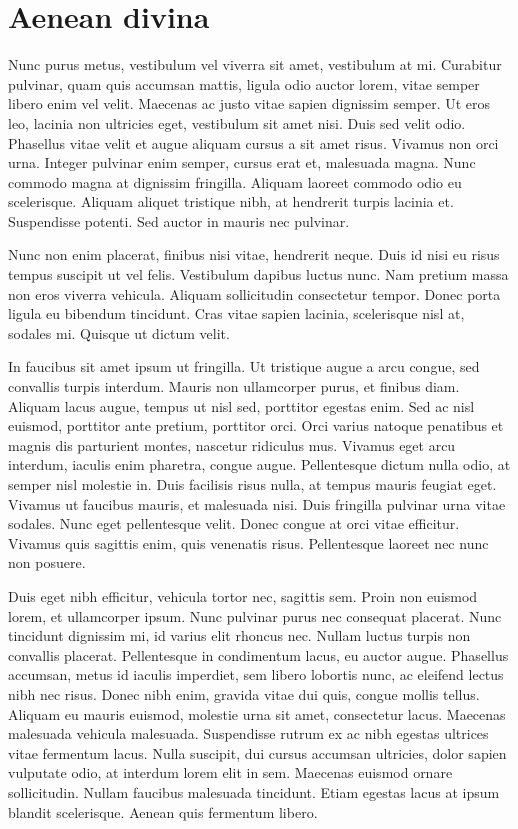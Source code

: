 \section{Aenean divina}

Nunc purus metus, vestibulum vel viverra sit amet, vestibulum at mi. Curabitur pulvinar, quam quis accumsan mattis, ligula odio auctor lorem, vitae semper libero enim vel velit. Maecenas ac justo vitae sapien dignissim semper. Ut eros leo, lacinia non ultricies eget, vestibulum sit amet nisi. Duis sed velit odio. Phasellus vitae velit et augue aliquam cursus a sit amet risus. Vivamus non orci urna. Integer pulvinar enim semper, cursus erat et, malesuada magna. Nunc commodo magna at dignissim fringilla. Aliquam laoreet commodo odio eu scelerisque. Aliquam aliquet tristique nibh, at hendrerit turpis lacinia et. Suspendisse potenti. Sed auctor in mauris nec pulvinar.

Nunc non enim placerat, finibus nisi vitae, hendrerit neque. Duis id nisi eu risus tempus suscipit ut vel felis. Vestibulum dapibus luctus nunc. Nam pretium massa non eros viverra vehicula. Aliquam sollicitudin consectetur tempor. Donec porta ligula eu bibendum tincidunt. Cras vitae sapien lacinia, scelerisque nisl at, sodales mi. Quisque ut dictum velit.

In faucibus sit amet ipsum ut fringilla. Ut tristique augue a arcu congue, sed convallis turpis interdum. Mauris non ullamcorper purus, et finibus diam. Aliquam lacus augue, tempus ut nisl sed, porttitor egestas enim. Sed ac nisl euismod, porttitor ante pretium, porttitor orci. Orci varius natoque penatibus et magnis dis parturient montes, nascetur ridiculus mus. Vivamus eget arcu interdum, iaculis enim pharetra, congue augue. Pellentesque dictum nulla odio, at semper nisl molestie in. Duis facilisis risus nulla, at tempus mauris feugiat eget. Vivamus ut faucibus mauris, et malesuada nisi. Duis fringilla pulvinar urna vitae sodales. Nunc eget pellentesque velit. Donec congue at orci vitae efficitur. Vivamus quis sagittis enim, quis venenatis risus. Pellentesque laoreet nec nunc non posuere.

Duis eget nibh efficitur, vehicula tortor nec, sagittis sem. Proin non euismod lorem, et ullamcorper ipsum. Nunc pulvinar purus nec consequat placerat. Nunc tincidunt dignissim mi, id varius elit rhoncus nec. Nullam luctus turpis non convallis placerat. Pellentesque in condimentum lacus, eu auctor augue. Phasellus accumsan, metus id iaculis imperdiet, sem libero lobortis nunc, ac eleifend lectus nibh nec risus. Donec nibh enim, gravida vitae dui quis, congue mollis tellus. Aliquam eu mauris euismod, molestie urna sit amet, consectetur lacus. Maecenas malesuada vehicula malesuada. Suspendisse rutrum ex ac nibh egestas ultrices vitae fermentum lacus. Nulla suscipit, dui cursus accumsan ultricies, dolor sapien vulputate odio, at interdum lorem elit in sem. Maecenas euismod ornare sollicitudin. Nullam faucibus malesuada tincidunt. Etiam egestas lacus at ipsum blandit scelerisque. Aenean quis fermentum libero.

